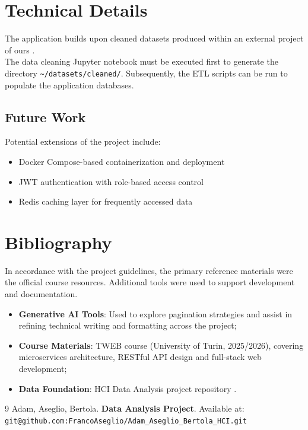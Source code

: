 \documentclass[11pt,a4paper]{article}
\begin{document}
\section{Technical Details}
The application builds upon cleaned datasets produced within an external project of ours \cite{DataAnalysisProject} . \\The data cleaning Jupyter notebook must be executed first to generate the directory \texttt{\textasciitilde/datasets/cleaned/}. Subsequently, the ETL scripts can be run to populate the application databases.

\subsection{Future Work}
Potential extensions of the project include:
\begin{itemize}
    \item Docker Compose-based containerization and deployment
    \item JWT authentication with role-based access control
    \item Redis caching layer for frequently accessed data
\end{itemize}

\section{Bibliography}
In accordance with the project guidelines, the primary reference materials were the official course resources. Additional tools were used to support development and documentation.
\begin{itemize}
    \item \textbf{Generative AI Tools}: Used to explore pagination strategies and assist in refining technical writing and formatting across the project;
    \item \textbf{Course Materials}: TWEB course (University of Turin, 2025/2026), covering microservices architecture, RESTful API design and full-stack web development;
    \item \textbf{Data Foundation}: HCI Data Analysis project repository \cite{DataAnalysisProject}.
\end{itemize}

\begin{thebibliography}{9}
     Adam, Aseglio, Bertola. \textbf{Data Analysis Project}. Available at: \\
    \texttt{git@github.com:FrancoAseglio/Adam\_Aseglio\_Bertola\_HCI.git}
\end{thebibliography}
\end{document}
